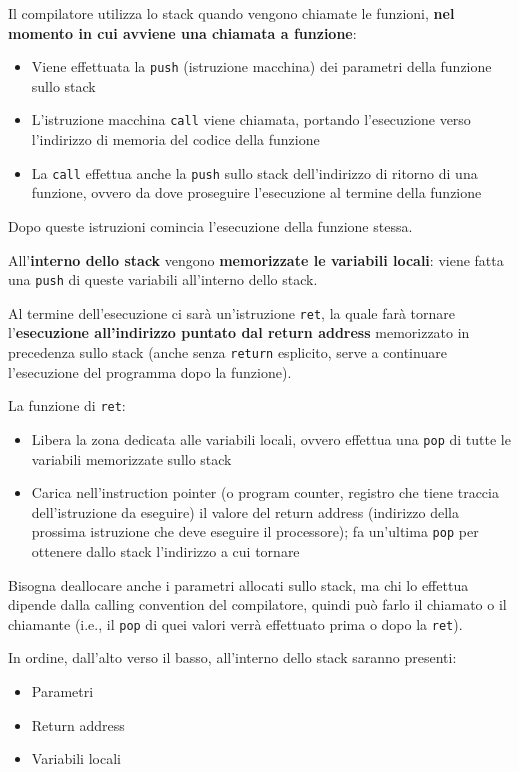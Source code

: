 Il compilatore utilizza lo stack quando vengono chiamate le funzioni, \textbf{nel momento in cui avviene una chiamata a funzione}:
\begin{itemize}
	\item Viene effettuata la \texttt{push} (istruzione macchina) dei parametri della funzione sullo stack
	
    \item L'istruzione macchina \texttt{call} viene chiamata, portando l'esecuzione verso l'indirizzo di memoria del codice della funzione
	
    \item La \texttt{call} effettua anche la \texttt{push} sullo stack dell'indirizzo di ritorno di una funzione, ovvero da dove proseguire l'esecuzione al termine della funzione 
\end{itemize}

Dopo queste istruzioni comincia l'esecuzione della funzione stessa.

All'\textbf{interno dello stack} vengono \textbf{memorizzate le variabili locali}: viene fatta una \texttt{push} di queste variabili all'interno dello stack.

Al termine dell'esecuzione ci sarà un'istruzione \texttt{ret}, la quale farà tornare l'\textbf{esecuzione all'indirizzo puntato dal return address} memorizzato in precedenza sullo stack (anche senza \texttt{return} esplicito, serve a continuare l'esecuzione del programma dopo la funzione).

La funzione di \texttt{ret}: 
\begin{itemize}
	\item Libera la zona dedicata alle variabili locali, ovvero effettua una \texttt{pop} di tutte le variabili memorizzate sullo stack
    
	\item Carica nell'instruction pointer (o program counter, registro che tiene traccia dell'istruzione da eseguire) il valore del return address (indirizzo della prossima istruzione che deve eseguire il processore); fa un'ultima \texttt{pop} per ottenere dallo stack l'indirizzo a cui tornare
\end{itemize}

Bisogna deallocare anche i parametri allocati sullo stack, ma chi lo effettua dipende dalla calling convention del compilatore, quindi può farlo il chiamato o il chiamante (i.e., il \texttt{pop} di quei valori verrà effettuato prima o dopo la \texttt{ret}).

In ordine, dall'alto verso il basso, all'interno dello stack saranno presenti: 
\begin{itemize}
	\item Parametri 

	\item Return address

	\item Variabili locali
\end{itemize}

